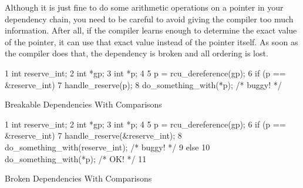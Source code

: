 Although it is just fine to do some arithmetic operations on a pointer in
your dependency chain, you need to be careful to avoid giving the
compiler too much information.
After all, if the compiler learns enough to determine the exact value
of the pointer, it can use that exact value instead of the pointer itself.
As soon as the compiler does that, the dependency is broken and all
ordering is lost.
\fi

\begin{listing}[tbp]
{ \scriptsize
\begin{verbbox}
 1 int reserve_int;
 2 int *gp;
 3 int *p;
 4
 5 p = rcu_dereference(gp);
 6 if (p == &reserve_int)
 7   handle_reserve(p);
 8 do_something_with(*p); /* buggy! */
\end{verbbox}
}
\centering
\theverbbox
\caption{Breakable Dependencies With Comparisons}
\label{lst:memorder:Breakable Dependencies With Comparisons}
\end{listing}

\begin{listing}[tbp]
{ \scriptsize
\begin{verbbox}
 1 int reserve_int;
 2 int *gp;
 3 int *p;
 4
 5 p = rcu_dereference(gp);
 6 if (p == &reserve_int) {
 7   handle_reserve(&reserve_int);
 8   do_something_with(reserve_int); /* buggy! */
 9 } else {
10   do_something_with(*p); /* OK! */
11 }
\end{verbbox}
}
\centering
\theverbbox
\caption{Broken Dependencies With Comparisons}
\label{lst:memorder:Broken Dependencies With Comparisons}
\end{listing}

